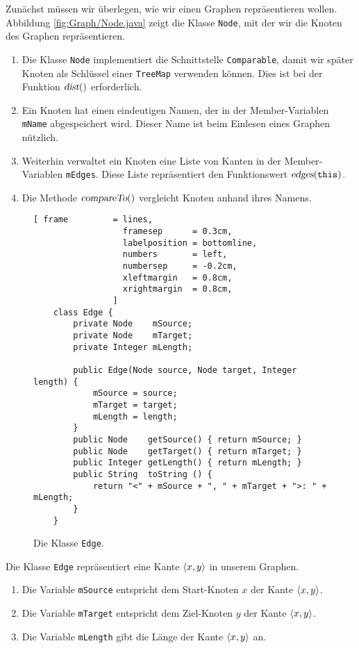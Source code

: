 Zun\"achst m\"ussen wir \"uberlegen, wie wir einen Graphen repr\"asentieren wollen.
Abbildung \ref{fig:Graph/Node.java} zeigt die Klasse \texttt{Node}, mit der wir die Knoten
des Graphen repr\"asentieren.
\begin{enumerate}
\item Die Klasse \texttt{Node} implementiert die Schnittstelle \texttt{Comparable},
      damit wir sp\"ater Knoten als Schl\"ussel einer \texttt{TreeMap} verwenden k\"onnen.
      Dies ist bei der Funktion $\textsl{dist}()$ erforderlich.
\item Ein Knoten hat einen eindeutigen Namen, der in der Member-Variablen \texttt{mName}
      abgespeichert wird.  Dieser Name ist beim Einlesen eines Graphen n\"utzlich.
\item Weiterhin verwaltet ein Knoten eine Liste von Kanten in der Member-Variablen
      \texttt{mEdges}.  Diese Liste repr\"asentiert den Funktionswert $\textsl{edges}(\mathtt{this})$.
\item Die Methode $\textsl{compareTo}()$ vergleicht Knoten anhand ihres Namens.
\end{enumerate}

\begin{figure}[!ht]
\centering
\begin{Verbatim}[ frame         = lines, 
                  framesep      = 0.3cm, 
                  labelposition = bottomline,
                  numbers       = left,
                  numbersep     = -0.2cm,
                  xleftmargin   = 0.8cm,
                  xrightmargin  = 0.8cm,
                ]
    class Edge {
        private Node    mSource;
        private Node    mTarget;
        private Integer mLength;
        
        public Edge(Node source, Node target, Integer length) {
            mSource = source;
            mTarget = target;
            mLength = length;
        }   
        public Node    getSource() { return mSource; }
        public Node    getTarget() { return mTarget; }
        public Integer getLength() { return mLength; }
        public String  toString () {
            return "<" + mSource + ", " + mTarget + ">: " + mLength;
        }
    }
\end{Verbatim}
\vspace*{-0.3cm}
\caption{Die Klasse \texttt{Edge}.}
\label{fig:Graph/Edge.java}
\end{figure}

\noindent
Die Klasse \texttt{Edge} repr\"asentiert eine Kante $\pair(x,y)$ in unserem Graphen.
\begin{enumerate}
\item Die Variable \texttt{mSource} entspricht dem Start-Knoten $x$ der Kante $\pair(x,y)$.
\item Die Variable \texttt{mTarget} entspricht dem Ziel-Knoten $y$ der Kante $\pair(x,y)$.
\item Die Variable \texttt{mLength} gibt die L\"ange der Kante $\pair(x,y)$ an.
\end{enumerate}


